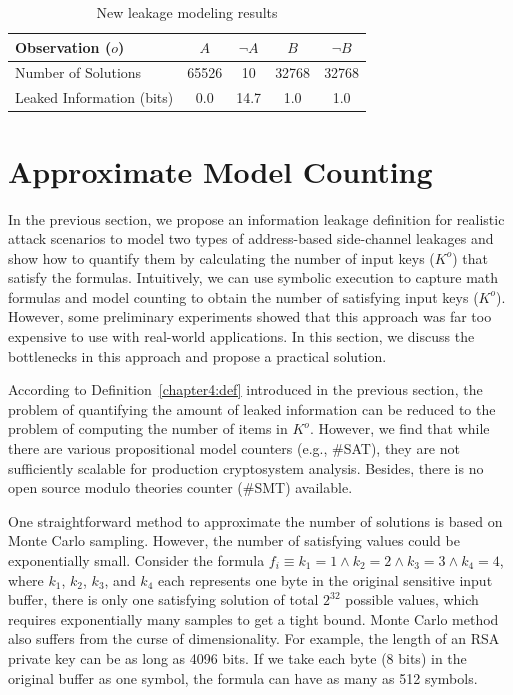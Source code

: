 \begin{table}[ht]
    \centering%
    \caption{New leakage modeling results}
    \label{shtable2}
    \begin{tabular}{l|cc|cc}
        \hline

        Observation ($o$)         & $A$   & $\neg A$ & $B$   & $\neg B$ \\ \hline
        Number of Solutions       & 65526 & 10       & 32768 & 32768    \\ \hline
        Leaked Information (bits) & 0.0   & 14.7     & 1.0   & 1.0      \\
        \hline
    \end{tabular}
\end{table}

\section{Approximate Model Counting}
\label{MCreasons}
In the previous section, we propose an information leakage definition for realistic attack scenarios to model two types of address-based side-channel leakages and show how to quantify them by calculating the number of input keys ($K^o$) that satisfy the formulas. Intuitively, we can use symbolic execution to capture math formulas and model counting to obtain the number of satisfying input keys ($K^o$). However, some preliminary experiments showed that this approach was far too expensive to use with real-world applications. In this section, we discuss the bottlenecks in this approach and propose a practical solution.


According to Definition~\ref{chapter4:def} introduced in the previous section,
the problem of quantifying the amount of leaked information can be reduced to
the problem of computing the number of items in $K^o$. However, we find that while
there are various propositional model counters (e.g., \#SAT), they are not
sufficiently scalable for production cryptosystem analysis.
Besides, there is no open source modulo theories counter (\#SMT) available.

One straightforward method to approximate the number of solutions is based on Monte Carlo
sampling. However, the number of satisfying values could be exponentially small.
Consider the formula $f_i\equiv{k_1} = 1\land{k_2} = 2\land{k_3} = 3\land{k_4} =
    4$, where $k_1$, $k_2$, $k_3$, and $k_4$ each represents one byte in the
original sensitive input buffer, there is only one satisfying solution of total
$2^{32}$ possible values, which requires exponentially many samples to get a
tight bound. Monte Carlo method also suffers from the curse of dimensionality.
For example, the length of an RSA private key can be as long as 4096 bits. If we
take each byte (8 bits) in the original buffer as one symbol, the formula can
have as many as 512 symbols.

